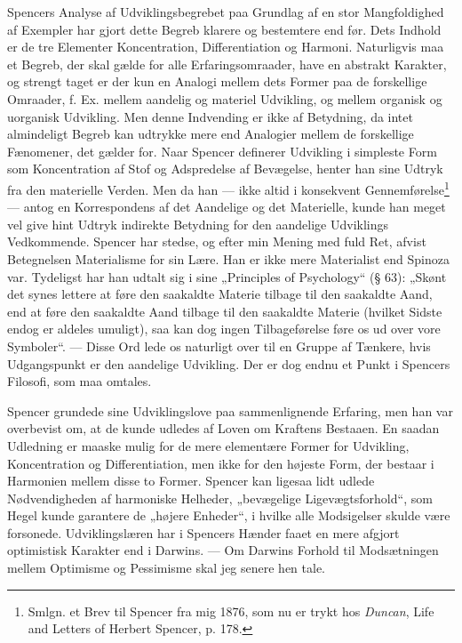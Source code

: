 \documentclass[12pt,a4paper,openany]{book}
\newcommand{\opage}[1]{\marginnote{\footnotesize\textit{[#1]}}}
\begin{document}
Spencers Analyse af Udviklingsbegrebet paa Grundlag af
en stor Mangfoldighed af Exempler har gjort dette Begreb
klarere og bestemtere end før. Dets Indhold er de tre Elementer
Koncentration, Differentiation og Harmoni. Naturligvis
maa et Begreb, der skal gælde for alle Erfaringsomraader, have
en abstrakt Karakter, og strengt taget er der kun en Analogi
mellem dets Former paa de forskellige Omraader, f. Ex. mellem
aandelig og materiel Udvikling, og mellem organisk og uorganisk
Udvikling. Men denne Indvending er ikke af Betydning, da
intet almindeligt Begreb kan udtrykke mere end Analogier
mellem de forskellige Fænomener, det gælder for. Naar Spencer
definerer Udvikling i simpleste Form som Koncentration af Stof
og Adspredelse af Bevægelse, henter han sine Udtryk fra den
materielle Verden. Men da han --- ikke altid i konsekvent
Gennemførelse\footnote[1]{Smlgn. et Brev til Spencer fra mig 1876, som nu er trykt hos \textit{Duncan}, Life and Letters of Herbert Spencer, p. 178.} --- antog en Korrespondens af det Aandelige
og det Materielle, kunde han meget vel give hint Udtryk indirekte
Betydning for den aandelige Udviklings Vedkommende.
Spencer har stedse, og efter min Mening med fuld Ret, afvist
Betegnelsen Materialisme for sin Lære. Han er ikke mere
\setcounter{footnote}{0}%
\opage{212}Materialist end Spinoza var. Tydeligst har han udtalt sig i
sine „Principles of Psychology“ (§ 63): „Skønt det synes lettere
at føre den saakaldte Materie tilbage til den saakaldte Aand,
end at føre den saakaldte Aand tilbage til den saakaldte Materie
(hvilket Sidste endog er aldeles umuligt), saa kan dog ingen
Tilbageførelse føre os ud over vore Symboler“. --- Disse Ord
lede os naturligt over til en Gruppe af Tænkere, hvis Udgangspunkt
er den aandelige Udvikling. Der er dog endnu et Punkt
i Spencers Filosofi, som maa omtales.

Spencer grundede sine Udviklingslove paa sammenlignende
Erfaring, men han var overbevist om, at de kunde udledes af
Loven om Kraftens Bestaaen. En saadan Udledning er maaske
mulig for de mere elementære Former for Udvikling, Koncentration
og Differentiation, men ikke for den højeste Form, der
bestaar i Harmonien mellem disse to Former. Spencer kan ligesaa
lidt udlede Nødvendigheden af harmoniske Helheder, „bevægelige
Ligevægtsforhold“, som Hegel kunde garantere de
„højere Enheder“, i hvilke alle Modsigelser skulde være forsonede.
Udviklingslæren har i Spencers Hænder faaet en mere
afgjort optimistisk Karakter end i Darwins. --- Om Darwins
Forhold til Modsætningen mellem Optimisme og Pessimisme
skal jeg senere hen tale.
\end{document}
